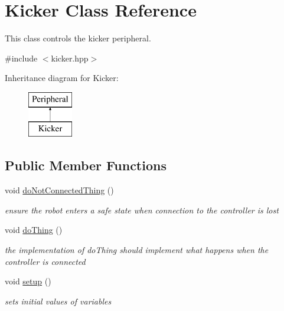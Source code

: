 \hypertarget{class_kicker}{}\section{Kicker Class Reference}
\label{class_kicker}


This class controls the kicker peripheral.  




{\ttfamily \#include $<$kicker.\+hpp$>$}

Inheritance diagram for Kicker\+:\begin{figure}[H]
\begin{center}
\leavevmode
\includegraphics[height=2.000000cm]{class_kicker}
\end{center}
\end{figure}
\subsection*{Public Member Functions}
\begin{DoxyCompactItemize}
\item 
\mbox{\label{class_kicker_a5cc008a16602853464a0db97672e7f7f}} 
void \mbox{\hyperlink{class_kicker_a5cc008a16602853464a0db97672e7f7f}{do\+Not\+Connected\+Thing}} ()
\begin{DoxyCompactList}\small\item\em ensure the robot enters a safe state when connection to the controller is lost \end{DoxyCompactList}\item 
\mbox{\label{class_kicker_a21e66856229e39fa6a0872f25ecb850b}} 
void \mbox{\hyperlink{class_kicker_a21e66856229e39fa6a0872f25ecb850b}{do\+Thing}} ()
\begin{DoxyCompactList}\small\item\em the implementation of do\+Thing should implement what happens when the controller is connected \end{DoxyCompactList}\item 
\mbox{\label{class_kicker_a3b5caef78a0b6f07a37978763d42b131}} 
void \mbox{\hyperlink{class_kicker_a3b5caef78a0b6f07a37978763d42b131}{setup}} ()
\begin{DoxyCompactList}\small\item\em sets initial values of variables \end{DoxyCompactList}\end{DoxyCompactItemize}


